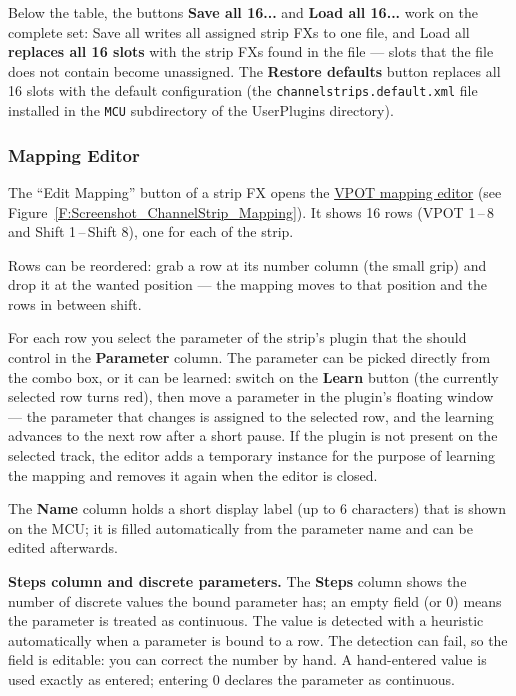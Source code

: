 Below the table, the buttons \textbf{Save all 16...} and
\textbf{Load all 16...} work on the complete set: Save all writes
all assigned strip FXs to one file, and Load all \textbf{replaces all
16 slots} with the strip FXs found in the file --- slots that the file does not
contain become unassigned. 
The \textbf{Restore defaults} button replaces all 16 slots with the
default configuration (the \texttt{channelstrips.default.xml} file
installed in the \texttt{MCU} subdirectory of the UserPlugins directory).

\subsubsection{Mapping Editor}\label{stripmapping}
The ``Edit Mapping'' button of a strip FX opens the
\hyperref[F:Screenshot_ChannelStrip_Mapping]{VPOT mapping editor} (see
Figure~\ref{F:Screenshot_ChannelStrip_Mapping}). It shows 16 rows
(VPOT 1\,--\,8 and Shift 1\,--\,Shift 8), one for each \vpot of the strip.


Rows can be reordered: grab a row at its number column (the small grip)
and drop it at the wanted position --- the mapping moves to that \vpot
position and the rows in between shift.

For each row you select the parameter of the strip's plugin that the
\vpot should control in the \textbf{Parameter} column. The parameter
can be picked directly from the combo box, or it can be
learned: switch on the \textbf{Learn} button (the currently
selected row turns red), then move a parameter in the plugin's
floating window --- the parameter that changes is assigned to the
selected row, and the learning advances to the next row after a short
pause. If the plugin is not present on the selected track, the editor
adds a temporary instance for the purpose of learning the mapping and
removes it again when the editor is closed.

The \textbf{Name} column holds a short display label
(up to 6 characters) that is shown on the MCU; it is filled automatically
from the parameter name and can be edited afterwards.

\textbf{Steps column and discrete parameters.}  The \textbf{Steps}
column shows the number of discrete values the bound parameter has; an
empty field (or $0$) means the parameter is treated as continuous. The
value is detected with a heuristic automatically when a parameter is
bound to a row. The detection can fail, so the field is
editable: you can correct the number by hand. A hand-entered
value is used exactly as entered; entering $0$ declares the parameter
as continuous.

